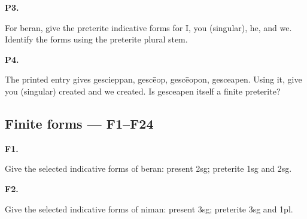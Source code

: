 \par\begin{minipage}{\linewidth}\raggedright
\textbf{P3.}

For beran, give the preterite indicative forms for I, you (singular), he, and we. Identify the forms using the preterite plural stem.

\end{minipage}\par\addvspace{4pt}

\par\begin{minipage}{\linewidth}\raggedright
\textbf{P4.}

The printed entry gives gescieppan, gescēop, gescēopon, gesceapen. Using it, give you (singular) created and we created. Is gesceapen itself a finite preterite?

\end{minipage}\par\addvspace{4pt}

\subsection*{Finite forms — F1–F24}

\par\begin{minipage}{\linewidth}\raggedright
\textbf{F1.}

Give the selected indicative forms of beran: present 2sg; preterite 1sg and 2sg.

\end{minipage}\par\addvspace{4pt}

\par\begin{minipage}{\linewidth}\raggedright
\textbf{F2.}

Give the selected indicative forms of niman: present 3sg; preterite 3sg and 1pl.

\end{minipage}\par\addvspace{4pt}

